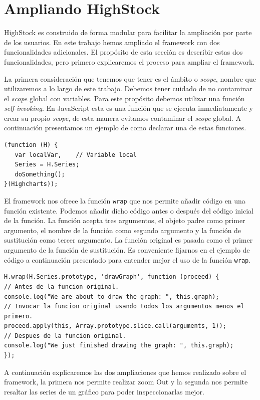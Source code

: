 \section{Ampliando HighStock}
	HighStock es construido de forma modular para facilitar la ampliación por parte de los usuarios. En este trabajo hemos ampliado el framework
	con dos funcionalidades adicionales. El propósito de esta sección es describir estas dos funcionalidades, pero primero explicaremos el proceso
	para ampliar el framework.
	\par
	La primera consideración que tenemos que tener es el ámbito o \emph{scope}, nombre que utilizaremos a lo largo de este trabajo. Debemos tener
	cuidado de no contaminar el \emph{scope} global con variables. Para este propósito debemos utilizar una función \emph{self-invoking}. En
	JavaScript esta es una función que se ejecuta inmediatamente y crear su propio \emph{scope}, de esta manera evitamos contaminar el
	\emph{scope} global. A continuación presentamos un ejemplo de como declarar una de estas funciones.
	\begin{lstlisting}
(function (H) {
   var localVar,	// Variable local
   Series = H.Series;
   doSomething();
}(Highcharts));
	\end{lstlisting}
	\par
	El framework nos ofrece la función \texttt{wrap} que nos permite añadir código en una función existente. Podemos añadir dicho código antes o
	después del código inicial de la función. La función acepta tres argumentos, el objeto padre como primer argumento, el nombre de la función
	como segundo argumento y la función de sustitución como tercer argumento. La función original es pasada como el primer argumento de la función
	de sustitución. Es conveniente fijarnos en el ejemplo de código a continuación presentado para entender mejor el uso de la función
	\texttt{wrap}.
	\begin{lstlisting}
H.wrap(H.Series.prototype, 'drawGraph', function (proceed) {
// Antes de la funcion original.
console.log("We are about to draw the graph: ", this.graph);
// Invocar la funcion original usando todos los argumentos menos el primero.
proceed.apply(this, Array.prototype.slice.call(arguments, 1));
// Despues de la funcion original.
console.log("We just finished drawing the graph: ", this.graph);
});
	\end{lstlisting}
	\par  
	A continuación explicaremos las dos ampliaciones que hemos realizado sobre el framework, la primera nos permite realizar zoom Out y la segunda
	nos permite resaltar las series de un gráfico para poder inspeccionarlas mejor.
